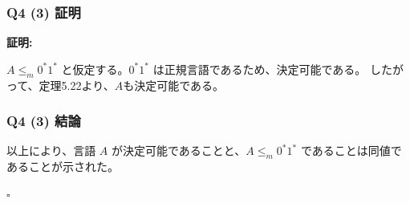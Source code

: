 \begin{frame}[fragile]
\frametitle{Q4 (3) 証明}

\textbf{証明:}

$A \leq_m 0^*1^*$ と仮定する。$0^*1^*$ は正規言語であるため、決定可能である。
したがって、定理5.22より、$A$も決定可能である。



\end{frame}

\begin{frame}[fragile]
\frametitle{Q4 (3) 結論}
以上により、言語 $A$ が決定可能であることと、$A \leq_m 0^*1^*$ であることは同値であることが示された。

\hfill $\square$

\end{frame}





























